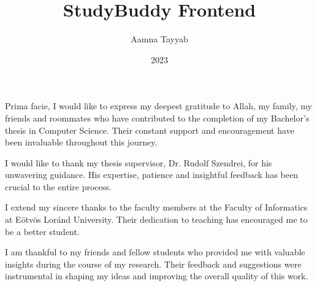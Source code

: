 \documentclass[
	parspace, %
	noindent, %
	nohyp, %
	final, %
]{elteikthesis}[2023/04/10]
\title{StudyBuddy Frontend} %
\date{2023} %
\author{Aamna Tayyab}
\affiliation{Associate Professor} %
\begin{document}


\maketitle


\cleardoublepage

\chapter*{\acklabel}
Prima facie, I would like to express my deepest gratitude to Allah, my family, my friends and roommates who have contributed to the completion of my Bachelor's thesis in Computer Science. Their constant support and encouragement have been invaluable throughout this journey.

I would like to thank my thesis supervisor, Dr. Rudolf Szendrei, for his unwavering guidance. His expertise, patience and insightful feedback has been crucial to the entire process. 

I extend my sincere thanks to the faculty members at the Faculty of Informatics at Eötvös Loránd University. Their dedication to teaching has encouraged me to be a better student.

I am thankful to my friends and fellow students who provided me with valuable insights during the course of my research. Their feedback and suggestions were instrumental in shaping my ideas and improving the overall quality of this work. 
\end{document}
